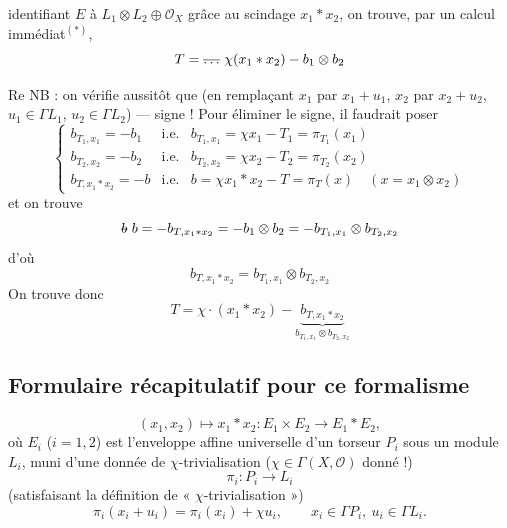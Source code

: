 \documentclass[11pt,a4paper]{article}
\begin{document}

identifiant $E$ à $L_1 \otimes L_2 \oplus \mathcal{O}_X$ grâce au scindage $x_1 * x_2$, on trouve, par un calcul immédiat${}^{(*)}$,
\[
  T = \text{\struck{$\ldots$}}\ \chi(x_1 * x_2) - b_1 \otimes b_2
\]


Re NB : on vérifie aussitôt que  (en remplaçant $x_1$ par $x_1 + u_1$, $x_2$ par $x_2 + u_2$, $u_1 \in \Gamma L_1$, $u_2 \in \Gamma L_2$) —  signe ! Pour éliminer le signe, il faudrait poser
\[
  \left\{\begin{array}{lll}
  b_{T_1,x_1} = -b_1 & \text{i.e.} & b_{T_1,x_1} = \chi x_1 - T_1 = \pi_{T_1}(x_1) \\
  b_{T_2,x_2} = -b_2 & \text{i.e.} & b_{T_2,x_2} = \chi x_2 - T_2 = \pi_{T_2}(x_2) \\
  b_{T,x_1 * x_2} = -b & \text{i.e.} & b = \chi x_1 * x_2 - T = \pi_T(x) \quad (x = x_1 \otimes x_2)
  \end{array}\right.
\]
et on trouve
\[
  \text{\struck{$b$}}\ b = -b_{T,x_1 * x_2} = -b_1 \otimes b_2 = -b_{T_1,x_1} \otimes b_{T_2,x_2}
\]
d'où
\[
  \boxed{b_{T,x_1 * x_2} = b_{T_1,x_1} \otimes b_{T_2,x_2}}
\]
On trouve donc
\[
  T = \chi \cdot (x_1 * x_2) - \underbrace{b_{T,x_1 * x_2}}_{b_{T_1,x_1} \otimes b_{T_2,x_2}}
\]

\subsection{Formulaire récapitulatif pour ce formalisme}

\[
  (x_1, x_2) \mapsto x_1 * x_2 : E_1 \times E_2 \to E_1 * E_2,
\]
où $E_i$ ($i = 1, 2$) est l'enveloppe affine universelle d'un torseur $P_i$ sous un module \struck{\ill{}} $L_i$, muni d'une donnée de $\chi$-trivialisation ($\chi \in \Gamma(X, \mathcal{O})$ donné !)
\[
  \pi_i : P_i \to L_i
\]
(satisfaisant la définition de « $\chi$-trivialisation »)
\[
  \pi_i(x_i + u_i) = \pi_i(x_i) + \chi u_i, \qquad x_i \in \Gamma P_i,\ u_i \in \Gamma L_i .
\]
\end{document}
